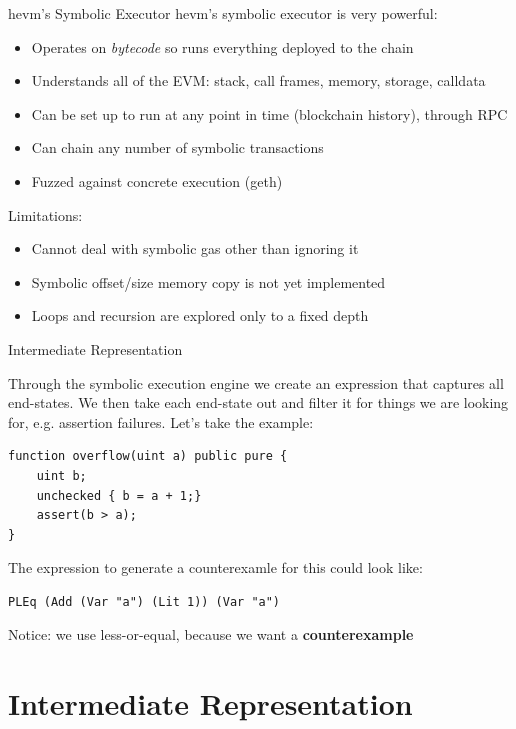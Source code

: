 \documentclass[aspectratio=169]{beamer}
\begin{document}
\begin{frame}{hevm's Symbolic Executor}
hevm's symbolic executor is very powerful:
\begin{itemize}
\item Operates on \emph{bytecode} so runs everything deployed to the chain
\item Understands all of the EVM: stack, call frames, memory, storage, calldata
\item Can be set up to run at any point in time (blockchain history), through RPC
\item Can chain any number of symbolic transactions
\item Fuzzed against concrete execution (geth)
\end{itemize}
\bigskip

Limitations:
\begin{itemize}
\item Cannot deal with symbolic gas other than ignoring it
\item Symbolic offset/size memory copy is not yet implemented
\item Loops and recursion are explored only to a fixed depth
\end{itemize}
\end{frame}

\begin{frame}[fragile=singleslide]{Intermediate Representation}
\small

Through the symbolic execution engine we create an expression that captures all end-states. We then take each end-state out and filter it for things we are looking for, e.g. assertion failures. Let's take the example:


\begin{Verbatim}[frame=single, framerule=0.2mm,framesep=2mm,fontsize=\small]
function overflow(uint a) public pure {
	uint b;
	unchecked { b = a + 1;}
	assert(b > a);
}
\end{Verbatim}

The expression to generate a counterexamle for this could look like:

\begin{Verbatim}[frame=single, framerule=0.2mm, framesep=2mm,fontsize=\small]
PLEq (Add (Var "a") (Lit 1)) (Var "a")
\end{Verbatim}

Notice: we use less-or-equal, because we want a \textbf{counterexample}
\end{frame}

\section{Intermediate Representation}
\end{document}
